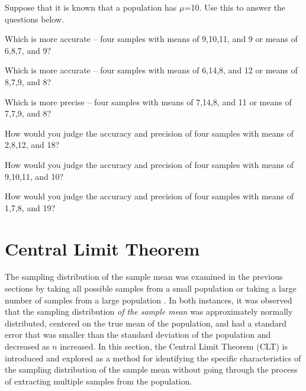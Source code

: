 \documentclass[10pt,openany]{book}\usepackage[]{graphicx}\usepackage[]{color}
\begin{document}
\newpage
\begin{exsection}
  \item \label{revex:SamplingDistPA} Suppose that it is known that a population has $\mu$=10.  Use this to answer the questions below. 
  \begin{Enumerate}
    \item Which is more accurate -- four samples with means of 9,10,11, and 9 or means of 6,8,7, and 9?
    \item Which is more accurate -- four samples with means of 6,14,8, and 12 or means of 8,7,9, and 8?
    \item Which is more precise -- four samples with means of 7,14,8, and 11 or means of 7,7,9, and 8?
    \item How would you judge the accuracy and precision of four samples with means of 2,8,12, and 18?
    \item How would you judge the accuracy and precision of four samples with means of 9,10,11, and 10?
    \item How would you judge the accuracy and precision of four samples with means of 1,7,8, and 19?
  \end{Enumerate}
\end{exsection}


\section{Central Limit Theorem} \label{sect:CLT}
The sampling distribution of the sample mean was examined in the previous sections by taking all possible samples from a small population  or taking a large number of samples from a large population .  In both instances, it was observed that the sampling distribution \textit{of the sample mean} was approximately normally distributed, centered on the true mean of the population, and had a standard error that was smaller than the standard deviation of the population and decreased as $n$ increased.  In this section, the Central Limit Theorem (CLT) is introduced and explored as a method for identifying the specific characteristics of the sampling distribution of the sample mean without going through the process of extracting multiple samples from the population.
\end{document}
